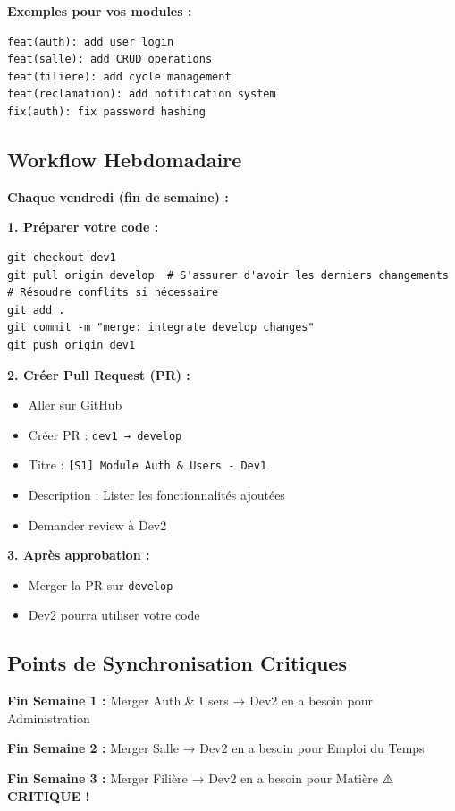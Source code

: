 \documentclass[11pt,a4paper]{article}
\begin{document}
\textbf{Exemples pour vos modules :}
\begin{verbatim}
feat(auth): add user login
feat(salle): add CRUD operations
feat(filiere): add cycle management
feat(reclamation): add notification system
fix(auth): fix password hashing
\end{verbatim}

\subsection{Workflow Hebdomadaire}

\textbf{Chaque vendredi (fin de semaine) :}

\textbf{1. Préparer votre code :}
\begin{verbatim}
git checkout dev1
git pull origin develop  # S'assurer d'avoir les derniers changements
# Résoudre conflits si nécessaire
git add .
git commit -m "merge: integrate develop changes"
git push origin dev1
\end{verbatim}

\textbf{2. Créer Pull Request (PR) :}
\begin{itemize}
    \item Aller sur GitHub
    \item Créer PR : \texttt{dev1 → develop}
    \item Titre : \texttt{[S1] Module Auth \& Users - Dev1}
    \item Description : Lister les fonctionnalités ajoutées
    \item Demander review à Dev2
\end{itemize}

\textbf{3. Après approbation :}
\begin{itemize}
    \item Merger la PR sur \texttt{develop}
    \item Dev2 pourra utiliser votre code
\end{itemize}

\subsection{Points de Synchronisation Critiques}

\textbf{Fin Semaine 1 :} Merger Auth \& Users → Dev2 en a besoin pour Administration

\textbf{Fin Semaine 2 :} Merger Salle → Dev2 en a besoin pour Emploi du Temps

\textbf{Fin Semaine 3 :} Merger Filière → Dev2 en a besoin pour Matière ⚠️ \textbf{CRITIQUE !}
\end{document}

